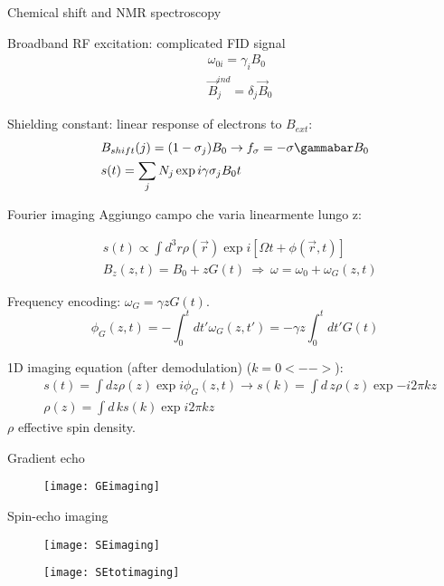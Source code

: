 \begin{frame}{Chemical shift and NMR spectroscopy}

Broadband RF excitation: complicated FID signal
\begin{align*}
&\omega_{0i}=\gamma_iB_0\\
&\vec{B}_j^{ind}=\delta_j\vec{B}_0
\end{align*}

Shielding constant: linear response of electrons to $B_{ext}$:
\begin{align*}
&B_{shift}(j)=(1-\sigma_j)B_0\to f_{\sigma}=-\sigma\gammabar B_0\\
&s(t)=\sum_jN_j\exp{i\gamma\sigma_jB_0t}
\end{align*}
\end{frame}


\begin{frame}{Fourier imaging}
Aggiungo campo che varia linearmente lungo z:

\begin{align*}
&s(t)\propto\int d^3 r\rho(\vec{r})\exp{i[\Omega t+\phi(\vec{r},t)]}\\
&B_z(z,t)=B_0+zG(t)\ \Rightarrow\ \omega=\omega_0+\omega_G(z,t)
\end{align*}

Frequency encoding: $\omega_G=\gamma zG(t)$.
\begin{equation*}
\phi_G(z,t)=-\int_0^td t'\omega_G(z,t')=-\gamma z\int_0^td t'G(t)
\end{equation*}

1D imaging equation (after demodulation) ($k=0<--> $):
\begin{align*}
&s(t)=\int d z\rho(z)\exp{i\phi_G(z,t)}\to s(k)=\int d\,z\rho(z)\exp{-i2\pi kz}\\
&\rho(z)=\int d\,ks(k)\exp{i2\pi kz}
\end{align*}
$\rho$ effective spin density.

\end{frame}

\begin{frame}{Gradient echo}
\begin{figure}[!ht]\texttt{[image: GEimaging]}\end{figure}
\end{frame}

\begin{frame}[allowframebreaks]{Spin-echo imaging}
\begin{figure}[!ht]\texttt{[image: SEimaging]}\end{figure}
\begin{figure}[!ht]\texttt{[image: SEtotimaging]}\end{figure}
\end{frame}

